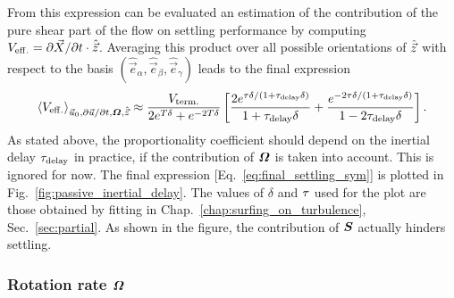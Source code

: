 From this expression can be evaluated an estimation of the contribution of the pure shear part of the flow on settling performance by computing $V_{\mathrm{eff.}} = \partial \vec{X}/ \partial t \cdot \hat{\vec{z}}$.
Averaging this product over all possible orientations of $\hat{\vec{z}}$ with respect to the basis $(\hat{\vec{e}}_\alpha, \hat{\vec{e}}_\beta, \hat{\vec{e}}_\gamma)$ leads to the final expression
\begin{equation}
	\left\langle V_{\mathrm{eff.}} \right\rangle_{\vec{u}_0, \partial \vec{u} / \partial t, \boldsymbol{\varOmega}, \hat{\vec{z}}} \approx \frac{V_{\mathrm{term.}}}{2 e^{T \delta} + e^{-2 T \delta}} \left[
		\frac{2 e^{\tau \delta/(1 + \tau_{\mathrm{delay}} \delta)}}{1 + \tau_{\mathrm{delay}} \delta} +
		\frac{e^{-2 \tau \delta/(1 + \tau_{\mathrm{delay}} \delta)}}{1 - 2 \tau_{\mathrm{delay}} \delta}
	 \right].
\end{equation}
As stated above, the proportionality coefficient should depend on the inertial delay $\tau_{\mathrm{delay}}$ in practice, if the contribution of $\boldsymbol{\varOmega}$ is taken into account.
This is ignored for now.
The final expression [Eq.~\ref{eq:final_settling_sym}] is plotted in Fig.~\ref{fig:passive_inertial_delay}. 
The values of $\delta$ and $\tau$ used for the plot are those obtained by fitting in Chap.~\ref{chap:surfing_on_turbulence}, Sec.~\ref{sec:partial}.
As shown in the figure, the contribution of $\boldsymbol{S}$ actually hinders settling.

\subsubsection{Rotation rate $\boldsymbol{\varOmega}$}

